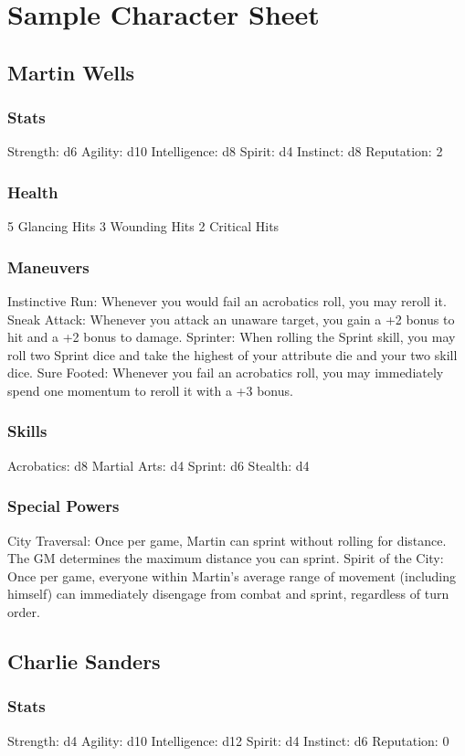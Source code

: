 \documentclass{article}
\begin{document}
\section{Sample Character Sheet}
\subsection{Martin Wells}
\subsubsection{Stats}
Strength: d6
Agility: d10
Intelligence: d8
Spirit: d4
Instinct: d8
Reputation: 2
\subsubsection{Health}
5 Glancing Hits
3 Wounding Hits
2 Critical Hits
\subsubsection{Maneuvers}
Instinctive Run: Whenever you would fail an acrobatics roll, you may reroll it.
Sneak Attack: Whenever you attack an unaware target, you gain a +2 bonus to hit and a +2 bonus to damage.
Sprinter: When rolling the Sprint skill, you may roll two Sprint dice and take the highest of your attribute die and your two skill dice.
Sure Footed: Whenever you fail an acrobatics roll, you may immediately spend one momentum to reroll it with a +3 bonus.
\subsubsection{Skills}
Acrobatics: d8
Martial Arts: d4
Sprint: d6
Stealth: d4
\subsubsection{Special Powers}
City Traversal: Once per game, Martin can sprint without rolling for distance. The GM determines the maximum distance you can sprint.
Spirit of the City: Once per game, everyone within Martin’s average range of movement (including himself) can immediately disengage from combat and sprint, regardless of turn order.
\subsection{Charlie Sanders}
\subsubsection{Stats}
Strength: d4
Agility: d10
Intelligence: d12
Spirit: d4
Instinct: d6
Reputation: 0
\end{document}
